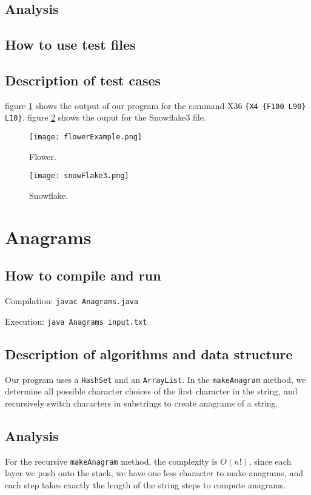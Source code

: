 \documentclass[12pt]{article}
\begin{document}
\subsection{Analysis}

\subsection{How to use test files}

\subsection{Description of test cases}
figure \ref{fig:flower} shows the output of our program for the command X36 
\texttt{\{X4 \{F100 L90\} L10\}}. figure \ref{fig:snowflake} shows the ouput for the 
Snowflake3 file.

\begin{figure}[!htp]
\texttt{[image: flowerExample.png]}
\caption{Flower.}
\label{fig:flower}
\end{figure}


\begin{figure}[!htp]
\texttt{[image: snowFlake3.png]}
\caption{Snowflake.}
\label{fig:snowflake}
\end{figure}



\newpage
\section{Anagrams}

\subsection{How to compile and run}
Compilation:
\texttt{javac Anagrams.java}

Execution:
\texttt{java\ Anagrams\ input.txt}

\subsection{Description of algorithms and data structure}
Our program uses a \texttt{HashSet} and an \texttt{ArrayList}. In the \texttt{makeAnagram} method, we determine all possible character choices of the first character in the string, and recursively switch characters in substrings to create anagrams of a string.

\subsection{Analysis}
For the recursive \texttt{makeAnagram} method, the complexity is $O(n!)$, since each layer we push onto the stack, we have one less character to make anagrams, and each step takes exactly the length of the string steps to compute anagrams.
\end{document}
